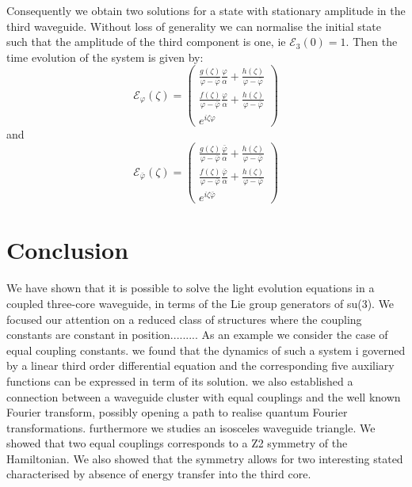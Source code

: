 \documentclass[9pt,twocolumn,twoside]{osajnl}
\begin{document}
Consequently we obtain two solutions for a state with stationary amplitude in the third waveguide.
 Without loss of generality we can normalise the initial state such that the amplitude of the third component is one, ie $\mathcal{E}_3(0)=1$.
 Then the time evolution of the system is given by:
\begin{equation}
\mathcal{E}_{\varphi}(\zeta)=\left( \begin{array}{c}
\frac{g(\zeta)}{\varphi -\bar{\varphi}}\frac{\varphi}{\alpha}+\frac{h(\zeta)}{\varphi -\bar{\varphi}} \\
\frac{f(\zeta)}{\varphi -\bar{\varphi}}\frac{\varphi}{\alpha}+\frac{h(\zeta)}{\varphi -\bar{\varphi}} \\
e^{i\zeta\varphi}
\end{array} \right)	
\end{equation}
and
\begin{equation}
\mathcal{E}_{\bar{\varphi}}(\zeta)=\left( \begin{array}{c}
\frac{g(\zeta)}{\varphi -\bar{\varphi}}\frac{\bar{\varphi}}{\alpha}+\frac{h(\zeta)}{\varphi -\bar{\varphi}} \\
\frac{f(\zeta)}{\varphi -\bar{\varphi}}\frac{\bar{\varphi}}{\alpha}+\frac{h(\zeta)}{\varphi -\bar{\varphi}} \\
e^{i\zeta\bar{\varphi}}
\end{array} \right)	
\end{equation}



\section{Conclusion}
We have shown that it is possible to solve the light evolution
equations in a coupled three-core waveguide, in terms of
the Lie group generators of su(3). We focused our attention on a
reduced class of structures where the coupling constants
are constant in position......... As an
example we consider the case of equal coupling constants.
we found that the dynamics of such a system i 
governed by a linear third order differential equation and the
corresponding five auxiliary functions can be expressed in term of its solution.
we also established a connection between a waveguide cluster
with equal couplings and the well known Fourier transform, possibly opening
a path to realise quantum Fourier transformations.
furthermore we studies an isosceles waveguide triangle.
We showed that two equal couplings corresponds to
a Z2 symmetry of the Hamiltonian. We also showed 
that the symmetry allows for two interesting stated
characterised by absence of energy transfer into the 
third core.









\end{document}

